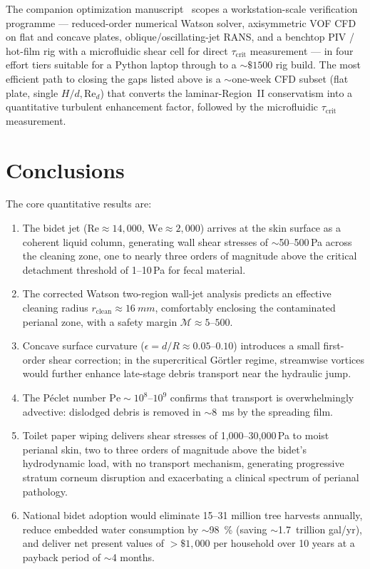 \documentclass[10pt,letterpaper]{article}
\newcommand{\Rey}{\mathrm{Re}}
\newcommand{\We}{\mathrm{We}}
\newcommand{\Pe}{\mathrm{Pe}}
\begin{document}
The companion optimization manuscript~\citep{BurtonOptPaper} scopes a
workstation-scale verification programme --- reduced-order numerical
Watson solver, axisymmetric VOF CFD on flat and concave plates,
oblique/oscillating-jet RANS, and a benchtop PIV / hot-film rig with a
microfluidic shear cell for direct $\tau_\mathrm{crit}$ measurement ---
in four effort tiers suitable for a Python laptop through to a
$\sim$$\$$$1500$ rig build. The most efficient path to closing the gaps
listed above is a $\sim$one-week CFD subset (flat plate, single
$H/d, \Rey_d$) that converts the laminar-Region~II conservatism into a
quantitative turbulent enhancement factor, followed by the microfluidic
$\tau_\mathrm{crit}$ measurement.

\section{Conclusions}
\label{sec:conclusion}

The core quantitative results are:

\begin{enumerate}[leftmargin=*]
    \item The bidet jet ($\Rey \approx 14{,}000$, $\We \approx 2{,}000$)
    arrives at the skin surface as a coherent liquid column, generating
    wall shear stresses of $\sim$50--500\,Pa across the cleaning zone, one
    to nearly three orders of magnitude above the critical detachment
    threshold of 1--10\,Pa for fecal material.
    \item The corrected Watson two-region wall-jet analysis predicts an
    effective cleaning radius $r_\mathrm{clean} \approx 16~mm$,
    comfortably enclosing the contaminated perianal zone, with a safety
    margin $\mathcal{M} \approx 5$--$500$.
    \item Concave surface curvature ($\epsilon = d/R \approx 0.05$--$0.10$)
    introduces a small first-order shear correction; in the supercritical
    G\"ortler regime, streamwise vortices would further enhance late-stage
    debris transport near the hydraulic jump.
    \item The P\'{e}clet number $\Pe \sim 10^{8}$--$10^{9}$ confirms that
    transport is overwhelmingly advective: dislodged debris is removed in
    $\sim$8~ms by the spreading film.
    \item Toilet paper wiping delivers shear stresses of 1{,}000--30{,}000\,Pa
    to moist perianal skin, two to three orders of magnitude above the
    bidet's hydrodynamic load, with no transport mechanism, generating
    progressive stratum corneum disruption and exacerbating a clinical
    spectrum of perianal pathology.
    \item National bidet adoption would eliminate 15--31 million tree
    harvests annually, reduce embedded water consumption by
    $\sim$98~\% (saving $\sim$1.7~trillion gal/yr), and
    deliver net present values of $>\$1{,}000$ per household over 10 years
    at a payback period of $\sim$4 months.
\end{enumerate}
\end{document}
